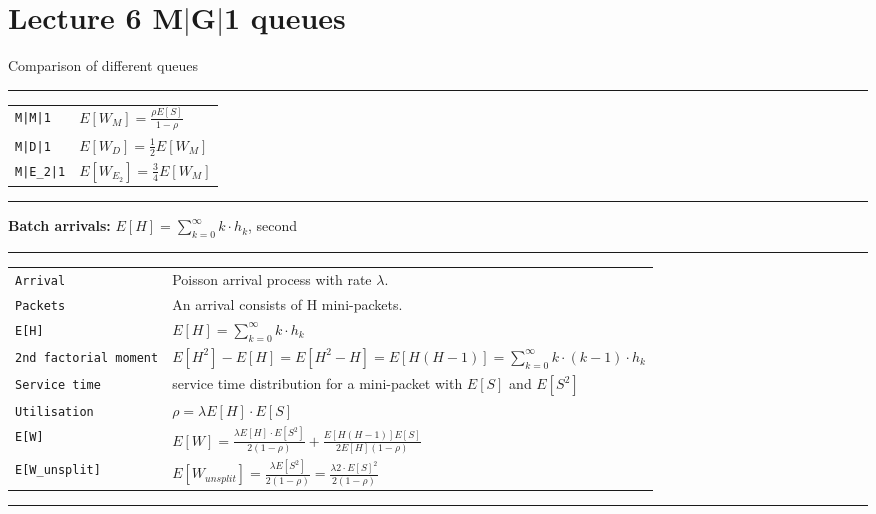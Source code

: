 \section{Lecture 6 M$|$G$|$1 queues}
Comparison of different queues
\hrule
\newlength{\MyLen}
\begin{tabular}{@{}p{\the\MyLen}@{}p{\linewidth-\the\MyLen}@{}}
\verb!M|M|1!	&  $E[W_M] = \frac{\rho E[S]}{1-\rho}$\\
\verb!M|D|1!	&  $E[W_D] = \frac{1}{2}E[W_M] $\\
\verb!M|E_2|1!	&  $E[W_{E_2}] = \frac{3}{4} E[W_M] $\\
\end{tabular}
\hrule

\textbf{Batch arrivals:} $E[H] = \sum_{k=0}^{\infty} k \cdot h_{k}$, second

\hrule
{}
\begin{tabular}{@{}p{\the\MyLen}@{}p{\linewidth-\the\MyLen}@{}}
\verb!Arrival!	&  Poisson arrival process with rate $\lambda$.\\
\verb!Packets!	&  An arrival consists of H mini-packets.\\
\verb!E[H]!	&  $E[H] = \sum_{k=0}^{\infty} k \cdot h_{k}$\\
\verb!2nd factorial moment!	&  $E[H^{2}] - E[H] = E[H^{2} - H] = E[H(H-1)]= \sum_{k=0}^{\infty} k \cdot (k-1) \cdot h_{k}$\\
\verb!Service time!	&  service time distribution for a mini-packet with $E[S]$ and $E[S^{2}]$\\
\verb!Utilisation!	&  $\rho = \lambda E[H] \cdot E[S]$\\
\verb!E[W]!	&  $E[W] = \frac{\lambda E[H] \cdot E[S^2]}{2(1-\rho)} + \frac{E[H(H-1)]E[S]}{2E[H](1-\rho)}$\\
\verb!E[W_unsplit]!	&  $E[W_{unsplit}] = \frac{\lambda E[S^{2}]}{2(1-\rho)} = \frac{\lambda 2 \cdot E[S]^{2}}{2(1-\rho)}$\\
\end{tabular}
\hrule

